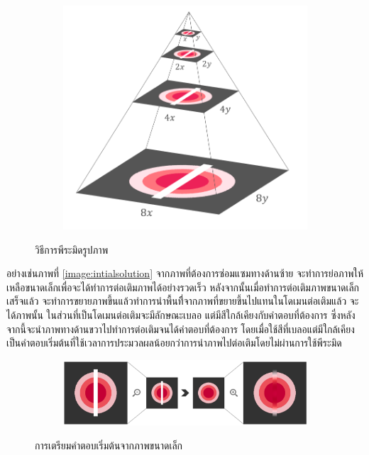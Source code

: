 \documentclass[hidelinks, a4paper,12pt]{article}
\numberwithin{equation}{section}							%
\numberwithin{equation}{section}
\begin{document}
{	 	\begin{figure}[H]
	 	\centering
	 	\begin{subfigure}{0.4\linewidth}
	 		\centering
	 		\includegraphics[width=0.8\linewidth]{images/image_inpaint_synthetic/image_pyramid.png}
	 	\end{subfigure}
 		 \caption{วิธีการพีระมิดรูปภาพ}
	 \end{figure}
 	\hspace{1cm} อย่างเช่นภาพที่ \ref{image:intialsolution} จากภาพที่ต้องการซ่อมแซมทางด้านซ้าย จะทำการย่อภาพให้เหลือขนาดเล็กเพื่อจะได้ทำการต่อเติมภาพได้อย่างรวดเร็ว หลังจากนั้นเมื่อทำการต่อเติมภาพขนาดเล็กเสร็จแล้ว จะทำการขยายภาพขึ้นแล้วทำการนำพื้นทีี่จากภาพที่ขยายขึ้นไปแทนในโดเมนต่อเติมแล้ว จะได้ภาพนั้น ในส่วนที่เป็นโดเมนต่อเติมจะมีลักษณะเบลอ แต่มีสีใกล้เคียงกับคำตอบที่ต้องการ  ซึ่งหลังจากนี้จะนำภาพทางด้านขวาไปทำการต่อเติมจนได้คำตอบที่ต้องการ โดยเมื่อใช้สีที่เบลอแต่มีใกล้เคียงเป็นคำตอบเริ่มต้นที่ใช้เวลาการประมวลผลน้อยกว่าการนำภาพไปต่อเติมโดยไม่ผ่านการใช้พีระมิด
	 \begin{figure}[H]
	 	\centering
	 	\begin{subfigure}{1\linewidth}
	 		\centering
	 		\includegraphics[width=0.8\linewidth]{images/image_inpaint_synthetic/image_inital_solution.png}
	 	\end{subfigure}
	 	\caption{การเตรียมคำตอบเริ่มต้นจากภาพขนาดเล็ก}

\end{figure}}
\end{document}
